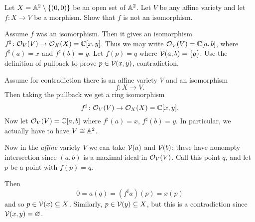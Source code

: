 \begin{problem}
	\onechili
	Let $X = \mathbb A^2 \setminus \{ (0,0) \}$ be an open set of $\mathbb A^2$.
	Let $V$ be any affine variety and let $f \colon X \to V$ be a morphism.
	Show that $f$ is not an isomorphism.
	\begin{hint}
		Assume $f$ was an isomorphism.
		Then it gives an isomorphism $f^\sharp \colon \mathcal O_V(V) \to \mathcal O_X(X) = \mathbb C[x,y]$.
		Thus we may write $\mathcal O_V(V) = \mathbb C[a,b]$,
		where $f^\sharp(a) = x$ and $f^\sharp(b) = y$.
		Let $f(p) = q$ where $\mathcal V(a,b) = \{q\}$.
		Use the definition of pullback to prove $p \in \mathcal V(x,y)$, contradiction.
	\end{hint}
	\begin{sol}
		Assume for contradiction there is an affine variety $V$
		and an isomorphism
		\[ f \colon X \to V. \]
		Then taking the pullback we get a ring isomorphism
		\[ f^\sharp \colon  \mathcal O_V(V) \to \mathcal O_X(X) = \mathbb C[x,y]. \]
		Now let $\mathcal O_V(V) = \mathbb C[a,b]$ where $f^\sharp(a) = x$, $f^\sharp(b) = y$.
		In particular, we actually have to have $V \cong \mathbb A^2$.

		Now in the \emph{affine} variety $V$ we can take $\mathcal V(a)$ and $\mathcal V(b)$;
		these have nonempty intersection since $(a,b)$
		is a maximal ideal in $\mathcal O_V(V)$.
		Call this point $q$, and let $p$ be a point with $f(p) = q$.

		Then
		\[ 0 = a(q) = (f^\sharp a)(p) = x(p) \]
		and so $p \in \mathcal V(x) \subseteq X$.
		Similarly, $p \in \mathcal V(y) \subseteq X$,
		but this is a contradiction since $\mathcal V(x,y) = \varnothing$.
	\end{sol}
\end{problem}
